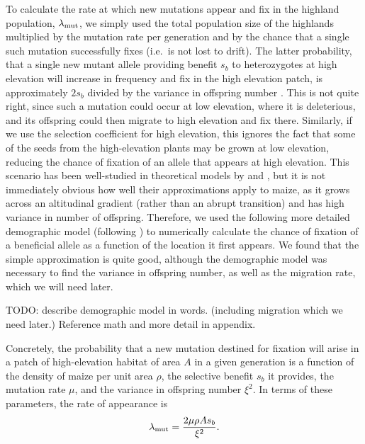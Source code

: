 To calculate the rate at which new mutations appear and fix in the highland population, $\lambda_{\text{mut}}$,
we simply used the total population size of the highlands
multiplied by the mutation rate per generation
and by the chance that a single such mutation successfully fixes
(i.e.\ is not lost to drift).
The latter probability, that a single new mutant allele providing benefit $s_b$ to heterozygotes at high elevation
will increase in frequency and fix in the high elevation patch,
is approximately $2s_b$ divided by the variance in offspring number \citep{jagers1975branching}.
This is not quite right, since such a mutation could occur at low elevation,
where it is deleterious,
and its offspring could then migrate to high elevation and fix there.
Similarly, if we use the selection coefficient for high elevation,
this ignores the fact that some of the seeds from the high-elevation plants may be grown at low elevation,
reducing the chance of fixation of an allele that appears at high elevation.
This scenario has been well-studied in theoretical models by \citet{polk} and \citet{barton1987establishment},
but it is not immediately obvious how well their approximations apply to maize,
as it grows across an altitudinal gradient (rather than an abrupt transition) and has high variance in number of offspring.
Therefore, we used the following more detailed demographic model (following \citet{vanHeerwaarden2010}) 
to numerically calculate the chance of fixation of a beneficial allele
as a function of the location it first appears.
We found that the simple approximation is quite good,
although the demographic model was necessary to find the variance in offspring number,
as well as the migration rate, which we will need later.

TODO: describe demographic model in words.  (including migration which we need later.)
Reference math and more detail in appendix.


Concretely, the probability that a new mutation destined for fixation
will arise in a patch of high-elevation habitat of area $A$ in a given generation
is a function of the density of maize per unit area $\rho$,
the selective benefit $s_b$ it provides,
the mutation rate $\mu$,
and the variance in offspring number $\xi^2$.
In terms of these parameters, the rate of appearance is
\begin{align} \label{eqn:mutrate}
  \lambda_{\text{mut}} = \frac{2 \mu \rho A s_b}{\xi^2} .
\end{align}

